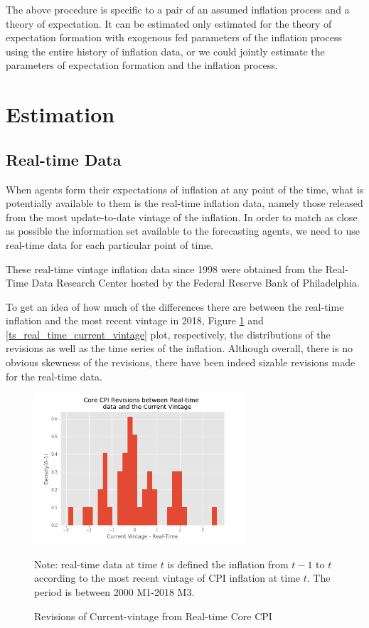 \documentclass[]{article}
\begin{document}
The above procedure is specific to a pair of an assumed inflation process and a theory of expectation. It can be estimated only estimated for the theory of expectation formation with exogenous fed parameters of the inflation process using the entire history of inflation data, or we could jointly estimate the parameters of expectation formation and the inflation process. 

\section{Estimation}
\subsection{Real-time Data}

When agents form their expectations of inflation at any point of the time, what is potentially available to them is the real-time inflation data, namely those released from the most update-to-date vintage of the inflation. In order to match as close as possible the information set available to the forecasting agents, we need to use real-time data for each particular point of time.  

These real-time vintage inflation data since 1998 were obtained from the Real-Time Data Research Center hosted by the Federal Reserve Bank of Philadelphia. 

To get an idea of how much of the differences there are between the real-time inflation and the most recent vintage in 2018, Figure \ref{real_time_rev} and \ref{ts_real_time_current_vintage} plot, respectively, the distributions of the revisions as well as the time series of the inflation. Although overall, there is no obvious skewness of the revisions, there have been indeed sizable revisions made for the real-time data. 

\begin{figure}[ht]
		\centering
\includegraphics[width=0.7\textwidth]{figures/hist_rev_realtime.png}
\caption{Revisions of Current-vintage from Real-time Core CPI}
\label{real_time_rev}
	\begin{flushleft}
	{\footnotesize Note: real-time data  at time $t$ is defined the inflation from $t-1$ to $t$ according to the most recent vintage of CPI inflation at time $t$. The period is between 2000 M1-2018 M3.}
\end{flushleft}
\end{figure}
\end{document}
